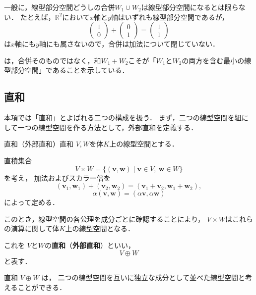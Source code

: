 \begin{remark}[合併は線型部分空間とは限らない]
一般に，線型部分空間どうしの合併$W_1 \cup W_2$は線型部分空間になるとは限らない．
たとえば，$\mathbb{R}^2$において$x$軸と$y$軸はいずれも線型部分空間であるが，
\[
  \begin{pmatrix} 1 \\ 0 \end{pmatrix}
  +
  \begin{pmatrix} 0 \\ 1 \end{pmatrix}
  =
  \begin{pmatrix} 1 \\ 1 \end{pmatrix}
\]
は$x$軸にも$y$軸にも属さないので，合併は加法について閉じていない．

は，合併そのものではなく，和$W_1 + W_2$こそが「$W_1$と$W_2$の両方を含む最小の線型部分空間」であることを示している．
\end{remark}

\subsection{直和}

本項では「直和」とよばれる二つの構成を扱う．
まず，二つの線型空間を組にして一つの線型空間を作る方法として，外部直和を定義する．

\begin{definition}{直和（外部直和）}{直和}
  $V,W$を体$K$上の線型空間とする．

  直積集合
  \[
  V\times W
  =
  \{
  (\bm{v},\bm{w})
  \mid
  \bm{v}\in V,\
  \bm{w}\in W
  \}
  \]
  を考え，
  加法およびスカラー倍を
  \[
  (\bm{v}_1,\bm{w}_1)+(\bm{v}_2,\bm{w}_2)
  =
  (\bm{v}_1+\bm{v}_2,\bm{w}_1+\bm{w}_2),
  \]
  \[
  \alpha(\bm{v},\bm{w})
  =
  (\alpha \bm{v},\alpha \bm{w})
  \]
  によって定める．

  このとき，線型空間の各公理を成分ごとに確認することにより，
  $V\times W$はこれらの演算に関して体$K$上の線型空間となる．

  これを
  $V$と$W$の\textbf{直和}（\textbf{外部直和}）といい，
  \[
  V\oplus W
  \]
  と表す．
\end{definition}

\begin{remark}[外部直和の直観]
直和
$V\oplus W$
は，
二つの線型空間を互いに独立な成分として並べた線型空間と考えることができる．
\end{remark}

